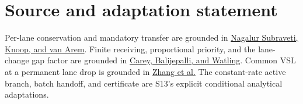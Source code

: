 \documentclass[11pt]{article}
\begin{document}
\section{Source and adaptation statement}

Per-lane conservation and mandatory transfer are grounded in
\href{https://doi.org/10.1080/21680566.2019.1700846}{Nagalur Subraveti,
Knoop, and van Arem}. Finite receiving, proportional priority, and the
lane-change gap factor are grounded in
\href{https://doi.org/10.1007/s11067-013-9193-7}{Carey, Balijepalli, and
Watling}. Common VSL at a permanent lane drop is grounded in
\href{https://doi.org/10.1080/23249935.2022.2033878}{Zhang et al.}
The constant-rate active branch, batch handoff, and certificate are S13's
explicit conditional analytical adaptations.
\end{document}
